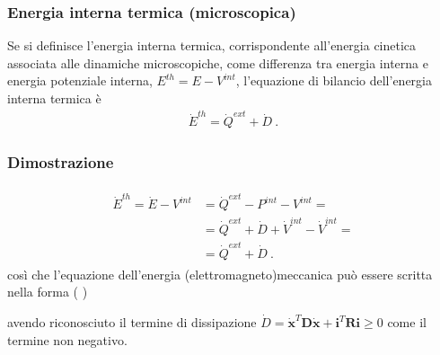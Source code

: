\documentclass[letterpaper,10pt,english]{jupyterBook}
\begin{document}
\subsubsection{Energia interna termica (microscopica)}
\label{\detokenize{ch/circuits-electromechanic:energia-interna-termica-microscopica}}
\sphinxAtStartPar
Se si definisce l’energia interna termica, corrispondente all’energia cinetica associata alle dinamiche microscopiche, come differenza tra energia interna e energia potenziale interna, \(E^{th} = E - V^{int}\), l’equazione di bilancio dell’energia interna termica è
\begin{equation*}
\begin{split}   \dot{E}^{th} = \dot{Q}^{ext} + \dot{D} \ . \end{split}
\end{equation*}\subsubsection*{Dimostrazione}
\begin{equation*}
\begin{split}\begin{aligned}
  \dot{E}^{th} = \dot{E} - V^{int}
    & = \dot{Q}^{ext} - P^{int} - V^{int} = \\
    & = \dot{Q}^{ext} + \dot{D} + \dot{V}^{int} - \dot{V}^{int} = \\
    & = \dot{Q}^{ext} + \dot{D} \ .
\end{aligned}\end{split}
\end{equation*}
\sphinxAtStartPar
così che l’equazione dell’energia (elettro\sphinxhyphen{}magneto\sphinxhyphen{})meccanica può essere scritta nella forma ( )

\sphinxAtStartPar
avendo riconosciuto il termine di dissipazione \(\dot{D} = \dot{\mathbf{x}}^T \mathbf{D} \dot{\mathbf{x}} + \mathbf{i}^T \mathbf{R} \mathbf{i} \ge 0\) come il termine non negativo.
\end{document}
